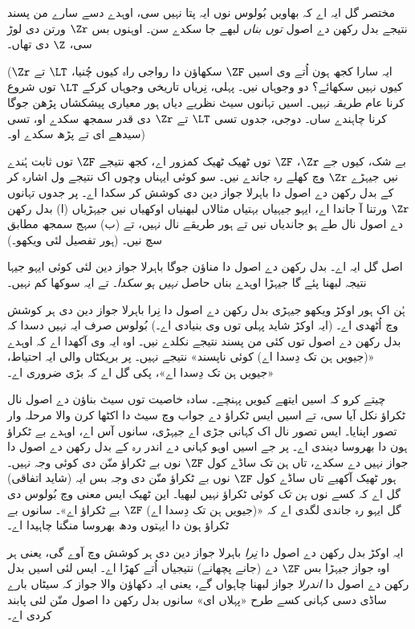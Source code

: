 \documentclass[../../../include/open-logic-section]{subfiles}
\begin{document}
مختصر گل ایہ اے کہ بھاویں بُولوس نوں ایہ پتا نہیں سی، اوہدے دسے سارے من پسند نتیجے بدل رکھن دے اصول \emph{توں بناں} لبھے جا سکدے سن۔ اوہنوں بس $\Zr$ ورتن دی لوڑ سی، $\Z$ دی تھاں۔

(ایہ سارا کجھ ہون اُتے وی اسیں $\ZF$ سکھاؤن دا رواجی راہ کیوں چُنیا، $\LT$ تے $\Zr$ کیوں نہیں سکھائے؟ دو وجوہاں نیں۔ پہلی، نِریاں تاریخی وجوہاں کرکے $\LT$ توں شروع کرنا عام طریقہ نہیں۔ اسیں تہانوں سیٹ نظریے دیاں ہور معیاری پیشکشاں پڑھن جوگا کرنا چاہندے ساں۔ دوجی، جدوں تسی $\LT$ تے $\Zr$ دی قدر سمجھ سکدے او، تسی سیدھے ای \citealt{Potter2004} تے \citealt{ButtonLT1} پڑھ سکدے او۔)

بے شک، کیوں جے $\Zr$، $\ZF$ توں ٹھیک ٹھیک کمزور اے، کجھ نتیجے $\ZF$ توں ثابت ہُندے نیں جیہڑے $\Zr$ وچ کھلے رہ جاندے نیں۔ سو کوئی ایہناں وچوں اک نتیجے ول اشارہ کر کے بدل رکھن دے اصول دا باہرلا جواز دین دی کوشش کر سکدا اے۔ پر جدوں تہانوں $\Zr$ ورتنا آ جاندا اے، ایہو جیہیاں بہتیاں مثالاں لبھنیاں اوکھیاں نیں جیہڑیاں (ا) بدل رکھن دے اصول نال طے ہو جاندیاں نیں تے ہور طریقے نال نہیں، تے (ب) سہج سمجھ مطابق سچ نیں۔ (ہور تفصیل لئی \citealt[\S13.2]{Potter2004} ویکھو۔)

اصل گل ایہ اے۔ بدل رکھن دے اصول دا مناؤن جوگا باہرلا جواز دین لئی کوئی ایہو جیہا نتیجہ لبھنا پئے گا جیہڑا اوہدے بناں حاصل \emph{نہیں ہو سکدا}۔ تے ایہ سوکھا کم نہیں۔

ہُن اک ہور اوکڑ ویکھو جیہڑی بدل رکھن دے اصول دا نِرا باہرلا جواز دین دی ہر کوشش وچ اُٹھدی اے۔ (ایہ اوکڑ شاید پہلی توں وی بنیادی اے۔) بُولوس صرف ایہ نہیں دسدا کہ بدل رکھن دے اصول توں کئی من پسند نتیجے نکلدے نیں۔ اوہ ایہ وی آکھدا اے کہ اوہدے «(جیویں ہن تک دِسدا اے) کوئی ناپسند» نتیجے نہیں۔ پر بریکٹاں والی ایہ احتیاط، «جیویں ہن تک دِسدا اے»، پکی گل اے کہ بڑی ضروری اے۔

چیتے کرو کہ اسیں ایتھے کیویں پہنچے۔ سادہ خاصیت توں سیٹ بناؤن دے اصول نال ٹکراؤ نکل آیا سی، تے اسیں ایس ٹکراؤ دے جواب وچ سیٹ دا اکٹھا کرن والا مرحلہ وار تصور اپنایا۔ ایس تصور نال اک کہانی جڑی اے جیہڑی، سانوں آس اے، اوہدے بے ٹکراؤ ہون دا بھروسا دیندی اے۔ پر جے اسیں اوہو کہانی دے اندر رہ کے بدل رکھن دے اصول دا جواز نہیں دے سکدے، تاں ہن تک ساڈے کول $\ZF$ نوں بے ٹکراؤ منّن دی کوئی وجہ نہیں۔ ہور ٹھیک آکھیے تاں ساڈے کول $\ZF$ نوں بے ٹکراؤ منّن دی وجہ بس ایہ (شاید اتفاقی) گل اے کہ کسے نوں \emph{ہن تک} کوئی ٹکراؤ نہیں لبھیا۔ این ٹھیک ایس معنی وچ بُولوس دی گل ایہو رہ جاندی لگدی اے کہ «(جیویں ہن تک دِسدا اے) $\ZF$ بے ٹکراؤ اے»۔ سانوں بے ٹکراؤ ہون دا ایہتوں ودھ بھروسا منگنا چاہیدا اے۔

ایہ اوکڑ بدل رکھن دے اصول دا \emph{نِرا} باہرلا جواز دین دی ہر کوشش وچ آوے گی، یعنی ہر اوہ جواز جیہڑا بس $\ZF$ دے (جانے پچھانے) نتیجیاں اُتے کھڑا اے۔ ایس لئی اسیں بدل رکھن دے اصول دا \emph{اندرلا} جواز لبھنا چاہواں گے، یعنی ایہ دکھاؤن والا جواز کہ سیٹاں بارے ساڈی دسی کہانی کسے طرح «پہلاں ای» سانوں بدل رکھن دا اصول منّن لئی پابند کردی اے۔
\end{document}
